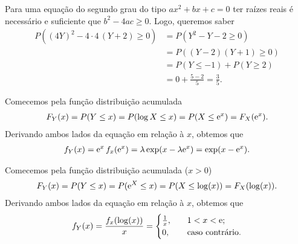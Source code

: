 \begin{questions}
\begin{solution}
	Para uma equação do segundo grau do tipo $ax^2+bx+c=0$ ter raízes reais é necessário e suficiente que $b^2-4ac\ge 0$. Logo, queremos saber
    \begin{align*}
    	P((4Y)^2-4\cdot4\,(Y+2) \ge 0)
        	&= P(Y^2-Y-2\ge 0) \\
        	&= P( (Y-2)(Y+1) \ge 0 )\\
            &= P(Y\le -1) + P(Y \ge 2)\\
            &= 0 + \frac{5-2}{5} = \frac{3}{5}.
    \end{align*}
\end{solution}

\begin{solution}
	Comecemos pela função distribuição acumulada
    \begin{align*}
    	F_Y(x) = P(Y \le x) = P(\log X \le x) = P(X \le \mathrm{e}^x) = F_X(\mathrm{e}^x).
    \end{align*}
    Derivando ambos lados da equação em relação à $x$, obtemos que
    \begin{align*}
    	f_Y(x) = \mathrm{e}^x\,f_x(\mathrm{e}^x)
        	= \lambda \exp(x-\lambda\mathrm{e}^x) = \exp(x-\mathrm{e}^x).
    \end{align*}
\end{solution}

\begin{solution}
	Comecemos pela função distribuição acumulada ($x>0$)
    \begin{align*}
    	F_Y(x) = P(Y \le x) = P(\mathrm{e}^X \le x) = P(X \le \log(x)) = F_X(\log(x)).
    \end{align*}
    Derivando ambos lados da equação em relação à $x$, obtemos que
    \begin{align*}
    	f_Y(x) = \frac{f_x(\log(x))}{x} = 
        \begin{cases}
        	\frac{1}{x},	&\quad 1<x<\mathrm{e};\\
            0,				&\quad \text{caso contrário}.
        \end{cases}
    \end{align*}
\end{solution}


\end{questions}
